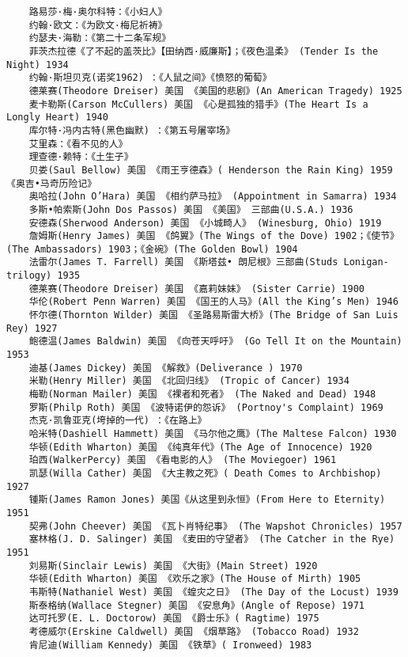 \documentclass[UTF8]{../../RepresentationUniverse}
\begin{document}
\begin{lstlisting}
    路易莎·梅·奥尔科特：《小妇人》
    约翰·欧文：《为欧文·梅尼祈祷》
    约瑟夫·海勒：《第二十二条军规》
    菲茨杰拉德《了不起的盖茨比》【田纳西·威廉斯】；《夜色温柔》 (Tender Is the Night) 1934
    约翰·斯坦贝克(诺奖1962) ：《人鼠之间》《愤怒的葡萄》
    德莱赛(Theodore Dreiser) 美国 《美国的悲剧》(An American Tragedy) 1925
    麦卡勒斯(Carson McCullers) 美国 《心是孤独的猎手》(The Heart Is a Longly Heart) 1940
    库尔特·冯内古特(黑色幽默) ：《第五号屠宰场》
    艾里森：《看不见的人》
    理查德·赖特：《土生子》
    贝娄(Saul Bellow) 美国 《雨王亨德森》( Henderson the Rain King) 1959《奥吉•马奇历险记》
    奥哈拉(John O’Hara) 美国 《相约萨马拉》 (Appointment in Samarra) 1934
    多斯•帕索斯(John Dos Passos) 美国 《美国》 三部曲(U.S.A.) 1936
    安德森(Sherwood Anderson) 美国 《小城畸人》 (Winesburg, Ohio) 1919
    詹姆斯(Henry James) 美国 《鸽翼》(The Wings of the Dove) 1902；《使节》(The Ambassadors) 1903；《金碗》(The Golden Bowl) 1904
    法雷尔(James T. Farrell) 美国 《斯塔兹• 朗尼根》三部曲(Studs Lonigan-trilogy) 1935
    德莱赛(Theodore Dreiser) 美国 《嘉莉妹妹》 (Sister Carrie) 1900
    华伦(Robert Penn Warren) 美国 《国王的人马》(All the King’s Men) 1946
    怀尔德(Thornton Wilder) 美国 《圣路易斯雷大桥》(The Bridge of San Luis Rey) 1927
    鲍德温(James Baldwin) 美国 《向苍天呼吁》 (Go Tell It on the Mountain) 1953
    迪基(James Dickey) 美国 《解救》(Deliverance ) 1970
    米勒(Henry Miller) 美国 《北回归线》 (Tropic of Cancer) 1934
    梅勒(Norman Mailer) 美国 《裸者和死者》 (The Naked and Dead) 1948
    罗斯(Philp Roth) 美国 《波特诺伊的怨诉》 (Portnoy's Complaint) 1969
    杰克·凯鲁亚克(垮掉的一代) ：《在路上》
    哈米特(Dashiell Hammett) 美国 《马尔他之鹰》(The Maltese Falcon) 1930
    华顿(Edith Wharton) 美国 《纯真年代》(The Age of Innocence) 1920
    珀西(WalkerPercy) 美国 《看电影的人》 (The Moviegoer) 1961
    凯瑟(Willa Cather) 美国 《大主教之死》( Death Comes to Archbishop) 1927
    锺斯(James Ramon Jones) 美国《从这里到永恒》(From Here to Eternity) 1951
    契弗(John Cheever) 美国 《瓦卜肖特纪事》 (The Wapshot Chronicles) 1957
    塞林格(J. D. Salinger) 美国 《麦田的守望者》 (The Catcher in the Rye) 1951
    刘易斯(Sinclair Lewis) 美国 《大街》(Main Street) 1920
    华顿(Edith Wharton) 美国 《欢乐之家》(The House of Mirth) 1905
    韦斯特(Nathaniel West) 美国 《蝗灾之日》 (The Day of the Locust) 1939
    斯泰格纳(Wallace Stegner) 美国 《安息角》(Angle of Repose) 1971
    达可托罗(E. L. Doctorow) 美国 《爵士乐》( Ragtime) 1975
    考德威尔(Erskine Caldwell) 美国 《烟草路》 (Tobacco Road) 1932
    肯尼迪(William Kennedy) 美国 《铁草》( Ironweed) 1983

\end{lstlisting}
\end{document}
